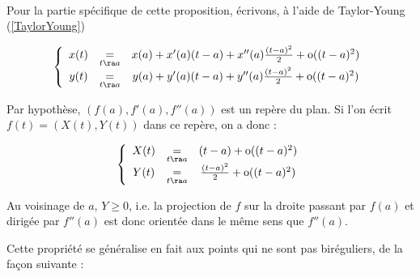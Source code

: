 \documentclass[12pt]{article}
\begin{document}
\begin{center}
  
\end{center}


\begin{demo}~

Pour la partie spécifique de cette proposition, écrivons, à l'aide de
Taylor-Young (\ref{TaylorYoung})

$$
\left\{
\begin{array}{ccc}
x(t)&\underset{t\ra
  a}{=}&x(a)+x'(a)(t-a)+x''(a)\frac{(t-a)^2}{2}+\text{o}((t-a)^2)\\
y(t)&\underset{t\ra
  a}{=}&y(a)+y'(a)(t-a)+y''(a)\frac{(t-a)^2}{2}+\text{o}((t-a)^2)\\
\end{array}
\right.
$$

Par hypothèse, $(f(a), f'(a), f''(a))$ est un repère du plan. Si l'on écrit
$f(t)=(X(t), Y(t)) $ dans ce repère, on a donc :

$$
\left\{
\begin{array}{ccc}
X(t)&\underset{t\ra
  a}{=}&(t-a)+\text{o}((t-a)^2)\\
Y(t)&\underset{t\ra
  a}{=}&\frac{(t-a)^2}{2}+\text{o}((t-a)^2)\\
\end{array}
\right.
$$

Au voisinage de $a$, $Y\geq0$, i.e. la projection de $f$ sur la droite
passant par $f(a)$ et dirigée par $f''(a)$ est donc orientée dans le même
sens que $f''(a)$.

\end{demo}


Cette propriété se généralise en fait aux points qui ne sont pas
biréguliers, de la façon suivante :
\end{document}
